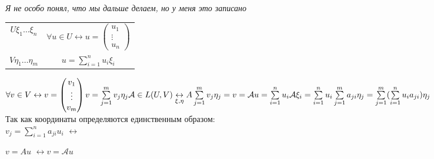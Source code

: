 \documentclass[12pt]{article}
\theoremstyle{remark}
\theoremstyle{definition}
\newcommand{\0}{\mathbb{0}}
\newcommand{\mybox}{
	\collectbox{
		\setlength{\fboxsep}{1pt}
		\fbox{\BOXCONTENT}
	}
}
\newcommand{\A}{\mathcal{A}}
\begin{document}
	\textit{Я не особо понял, что мы дальше делаем, но у меня это записано}\\
	\begin{tabular}{cc}
		$U \xi_1\ldots\xi_n$ & $\forall u \in U \leftrightarrow u = \begin{pmatrix}
		u_1\\
		\vdots\\
		u_n
		\end{pmatrix}$\\
		$V \eta_1\ldots\eta_m$ &
		$u = \sum\limits_{i=1}^{n}u_i\xi_i$
	\end{tabular}
	
	$\forall v\in V \leftrightarrow v = \begin{pmatrix}
		v_1\\
		\vdots\\
		v_m
	\end{pmatrix}\\	
	v = \sum\limits_{j=1}^{m}v_j\eta_j\\
	\A\in L(U, V) \underset{\xi, \eta}{\leftrightarrow} A\\
	\sum\limits_{j=1}^m v_j\eta_j = v = \A u = \sum\limits_{i=1}^n u_i\A\xi_i = \sum\limits_{i=1}^n u_i
	\sum\limits_{j=1}^m a_{ji}\eta_j = \sum\limits_{j=1}^m (\sum\limits_{i=1}^n u_i a_{ji})\eta_j$\\
	Так как координаты определяются единственным образом:\\
	\mybox{ 
		$ v_j = \sum\limits_{i=1}^n a_{ji}u_i $ 
	} 
	$\leftrightarrow$ 
	\mybox{$v = Au$} $\leftrightarrow v = \A u$
\end{document}
